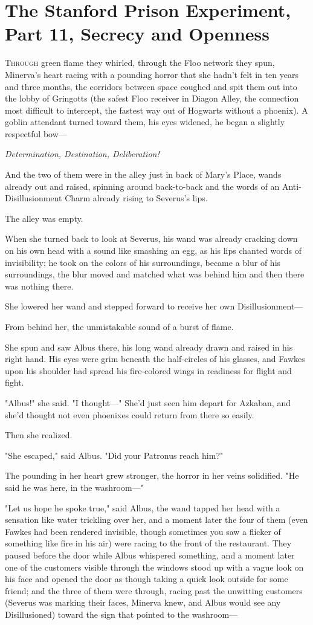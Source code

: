 \chapter{The Stanford Prison Experiment, Part 11, Secrecy and Openness}

\lettrine{T}{hrough} green
flame they whirled, through the Floo network they spun, Minerva's heart racing
with a pounding horror that she hadn't felt in ten years and three months, the
corridors between space coughed and spit them out into the lobby of Gringotts
(the safest Floo receiver in Diagon Alley, the connection most difficult to
intercept, the fastest way out of Hogwarts without a phoenix). A goblin
attendant turned toward them, his eyes widened, he began a slightly respectful
bow---

\emph{Determination, Destination, Deliberation!}

And the two of them were in the alley just in back of Mary's Place, wands
already out and raised, spinning around back-to-back and the words of an
Anti-Disillusionment Charm already rising to Severus's lips.

The alley was empty.

When she turned back to look at Severus, his wand was already cracking down on
his own head with a sound like smashing an egg, as his lips chanted words of
invisibility; he took on the colors of his surroundings, became a blur of his
surroundings, the blur moved and matched what was behind him and then there was
nothing there.

She lowered her wand and stepped forward to receive her own Disillusionment---

From behind her, the unmistakable sound of a burst of flame.

She spun and saw Albus there, his long wand already drawn and raised in his
right hand. His eyes were grim beneath the half-circles of his glasses, and
Fawkes upon his shoulder had spread his fire-colored wings in readiness for
flight and fight.

"Albus!" she said. "I thought---" She'd just seen him depart for Azkaban, and
she'd thought not even phoenixes could return from there so easily.

Then she realized.

"She escaped," said Albus. "Did your Patronus reach him?"

The pounding in her heart grew stronger, the horror in her veins solidified.
"He said he was here, in the washroom---"

"Let us hope he spoke true," said Albus, the wand tapped her head with a
sensation like water trickling over her, and a moment later the four of them
(even Fawkes had been rendered invisible, though sometimes you saw a flicker of
something like fire in his air) were racing to the front of the restaurant.
They paused before the door while Albus whispered something, and a moment later
one of the customers visible through the windows stood up with a vague look on
his face and opened the door as though taking a quick look outside for some
friend; and the three of them were through, racing past the unwitting customers
(Severus was marking their faces, Minerva knew, and Albus would see any
Disillusioned) toward the sign that pointed to the washroom---

